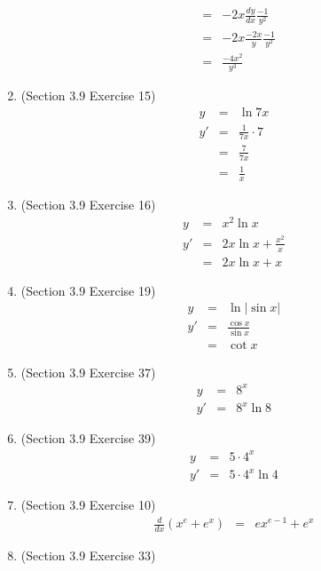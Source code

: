 \documentclass{article}
\begin{document}
\begin{enumerate}
\begin{eqnarray}
                              &=& -2x\frac{dy}{dx}\frac{-1}{y^2} \\
                              &=& -2x\frac{-2x}{y}\frac{-1}{y^2} \\
                              &=& \frac{-4x^2}{y^3}
        \end{eqnarray}
    \item (Section 3.9 Exercise 15)
        \begin{eqnarray}
            y &=& \ln{7x} \\
            y' &=& \frac{1}{7x} \cdot 7 \\
               &=& \frac{7}{7x} \\
               &=& \frac{1}{x}
        \end{eqnarray}
    \item (Section 3.9 Exercise 16)
        \begin{eqnarray}
            y &=& x^2\ln{x} \\
            y' &=& 2x\ln{x} + \frac{x^2}{x} \\
               &=& 2x\ln{x} + x
        \end{eqnarray}
    \item (Section 3.9 Exercise 19)
        \begin{eqnarray}
            y &=& \ln{|\sin{x}|} \\
            y' &=& \frac{\cos{x}}{\sin{x}} \\
               &=& \cot{x}
        \end{eqnarray}
    \item (Section 3.9 Exercise 37)
        \begin{eqnarray}
            y &=& 8^x \\
            y' &=& 8^x\ln{8}
        \end{eqnarray}
    \item (Section 3.9 Exercise 39)
        \begin{eqnarray}
            y &=& 5 \cdot 4^x \\
            y' &=& 5 \cdot 4^x\ln{4}
        \end{eqnarray}
    \item (Section 3.9 Exercise 10)
        \begin{eqnarray}
            \frac{d}{dx}\left(x^e + e^x\right) &=& ex^{e-1} + e^x
        \end{eqnarray}
    \item (Section 3.9 Exercise 33)
        \begin{eqnarray}

\end{eqnarray}
\end{enumerate}
\end{document}
